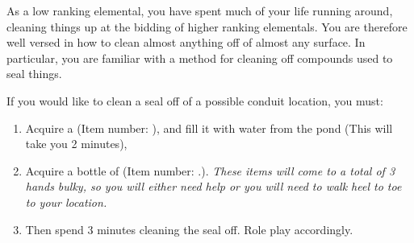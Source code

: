 \documentclass[green]{elementals}
\begin{document}
\name{\gUnsealConduit{}} 

As a low ranking elemental, you have spent much of your life running around, cleaning things up at the bidding of higher ranking elementals. You are therefore well versed in how to clean almost anything off of almost any surface. In particular, you are familiar with a method for cleaning off compounds used to seal things. 

If you would like to clean a seal off of a possible conduit location, you must: 
\begin{enumerate}
\item Acquire a \iBowl{} (Item number: \iBowl{\MYnumber{}}), and fill it with water from the pond (This will take you 2 minutes), 
\item Acquire a bottle of \iLye{} (Item number: \iLye{\MYnumber{}}.). \emph{These items will come to a total of 3 hands bulky, so you will either need help or you will need to  walk heel to toe to your location.} 
\item Then spend 3 minutes cleaning the seal off. Role play accordingly.
\end{enumerate}
\end{document}
